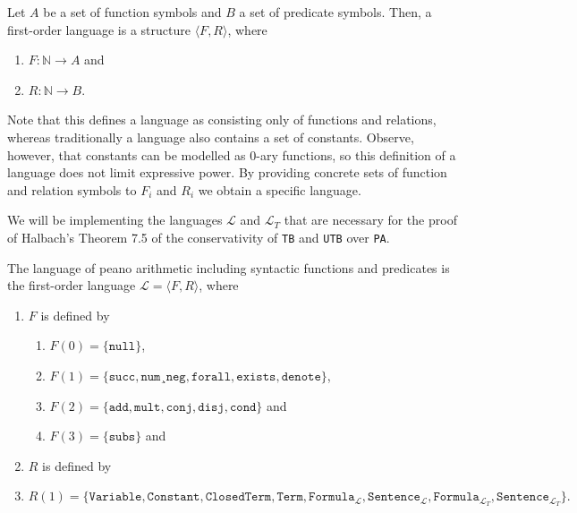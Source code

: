 \begin{definition}\label{def:fol}
    \leanok
    Let $A$ be a set of function symbols and $B$ a set of predicate symbols. Then, a first-order language is a structure $\langle F, R \rangle$, where 
        \begin{enumerate}
            \item $F : \mathbb{N} \to A$ and
            \item $R : \mathbb{N} \to B$.
        \end{enumerate}

\end{definition}

Note that this defines a language as consisting only of functions and relations, whereas traditionally a language also contains a set of constants. Observe, however, that constants can be modelled as $0$-ary functions, so this definition of a language does not limit expressive power. By providing concrete sets of function and relation symbols to $F_i$ and $R_i$ we obtain a specific language. 

We will be implementing the languages $\mathcal{L}$ and $\mathcal{L}_T$ that are necessary for the proof of Halbach's \cite{halbach2011} Theorem 7.5 of the conservativity of \texttt{TB} and \texttt{UTB} over \texttt{PA}.

\begin{definition}\label{def:l}
    \leanok
    The language of peano arithmetic including syntactic functions and predicates is the first-order language $\mathcal{L} = \langle F, R \rangle$, where
    \begin{enumerate}
        \item $F$ is defined by
        \begin{enumerate}
            \item $F(0) = \{\texttt{null}\}$,
            \item $F(1) = \{\texttt{succ},\texttt{num}¸\texttt{neg},\texttt{forall},\texttt{exists},\texttt{denote}\}$,
            \item $F(2) = \{\texttt{add},\texttt{mult},\texttt{conj},\texttt{disj},\texttt{cond}\}$ and
            \item $F(3) = \{\texttt{subs}\}$ and 
        \end{enumerate}
        \item $R$ is defined by \item $R(1) = \{\texttt{Variable},\texttt{Constant},\texttt{ClosedTerm},\texttt{Term},\texttt{Formula}_{\mathcal{L}}, \texttt{Sentence}_{\mathcal{L}},\texttt{Formula}_{\mathcal{L}_T},\texttt{Sentence}_{\mathcal{L}_T}\}.$
    \end{enumerate}
\end{definition} 


